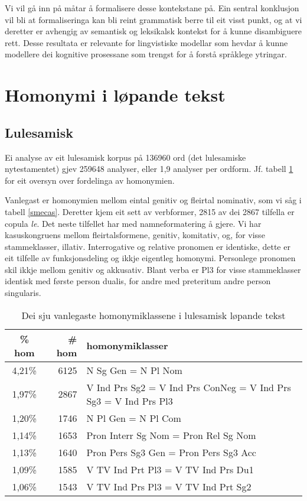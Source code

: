 \documentclass[a4paper,norsk]{article}
\begin{document}
Vi vil gå inn på måtar å formalisere desse kontekstane på. Ein sentral konklusjon vil bli at formaliseringa kan bli reint grammatisk berre til eit visst punkt, og at vi deretter er avhengig av semantisk og leksikalsk kontekst for å kunne disambiguere rett. Desse resultata er relevante for lingvistiske modellar som hevdar å kunne modellere dei kognitive prosessane som trengst for å forstå språklege ytringar.%


\section{Homonymi i løpande tekst}



\subsection{Lulesamisk} 
 
Ei analyse av eit lulesamisk korpus på 136960 ord (det lulesamiske nytestamentet) gjev 259648 analyser, eller 1,9 analyser per ordform. Jf. tabell \ref{smjhom} for eit oversyn over fordelinga av homonymien.%

Vanlegast er homonymien mellom eintal genitiv og fleirtal nominativ, som vi såg i tabell \ref{smecas}. Deretter kjem eit sett av verbformer, 2815 av dei 2867 tilfella er copula \textit{le}. Det neste tilfellet har med namneformatering å gjere. Vi har kasuskongruens mellom fleirtalsformene, genitiv, komitativ, og, for visse stammeklasser, illativ. Interrogative og relative pronomen er identiske, dette er eit tilfelle av funksjonsdeling og ikkje eigentleg homonymi. Personlege pronomen skil ikkje mellom genitiv og akkusativ. Blant verba er Pl3 for visse stammeklasser identisk med første person dualis, for andre med preteritum andre person singularis.%

\begin{table}[htdp]
\caption{Dei sju vanlegaste homonymiklassene i lulesamisk løpande tekst}
\begin{center}
\begin{tabular}{|c|r|l|}
\hline
\% hom & \# hom & homonymiklasser \\
\hline
4,21\% & 6125 & N Sg Gen  =  N Pl Nom  \\
1,97\% & 2867 & V Ind Prs Sg2  =  V Ind Prs ConNeg  =  V Ind Prs Sg3  =  V Ind Prs Pl3  \\
1,20\% & 1746 & N Pl Gen  =  N Pl Com  \\
1,14\% & 1653 & Pron Interr Sg Nom  =  Pron Rel Sg Nom  \\
1,13\% & 1640 & Pron Pers Sg3 Gen  =  Pron Pers Sg3 Acc  \\
1,09\% & 1585 & V TV Ind Prt Pl3  =  V TV Ind Prs Du1  \\
1,06\% & 1543 & V TV Ind Prs Pl3  =  V TV Ind Prt Sg2  \\
\hline
\end{tabular}
\end{center}
\label{smjhom}
\end{table}%
\end{document}
